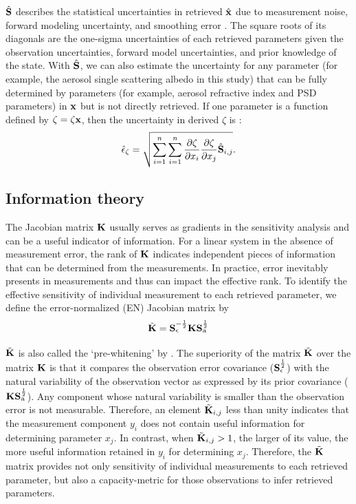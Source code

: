 $\hat{\mathbf{S}}$ describes the statistical uncertainties in retrieved
$\hat{\mathbf{x}}$ due to measurement noise, forward modeling uncertainty, 
and smoothing error \citep{Rodgers00}. The square roots of its 
diagonals are the one-sigma uncertainties of each retrieved parameters 
given the observation uncertainties, forward model uncertainties, 
and prior knowledge of the state. With $\hat{\mathbf{S}}$, we can also 
estimate the uncertainty for any parameter (for example, the aerosol single 
scattering albedo in this study) that can be fully
determined by parameters (for example, aerosol refractive index and PSD
parameters) in $\mathbf{x}$ but is not directly retrieved. If one
parameter is a function defined by $\zeta=\zeta{\mathbf{x}}$, then the 
uncertainty in derived $\zeta$ is \citep{Rodgers00}:
\begin{equation}
\hat{\epsilon}_\zeta =
\sqrt{\sum_{i=1}^n\sum_{i=1}^n
      \frac{\partial\zeta}{\partial{x_i}} 
      \frac{\partial\zeta}{\partial{x_j}}
      \hat{\mathbf{S}}_{i,j}
      }.\label{eq:zeta}
\end{equation}

\subsection{Information theory} \label{subsec:infotheory}

The Jacobian matrix $\mathbf{K}$ usually serves as gradients in the sensitivity
analysis and can be a useful indicator of information. For a linear
system in the absence of measurement error, the rank of $\mathbf{K}$ indicates
independent pieces of information that can be determined from the
measurements. In practice, error inevitably presents in measurements and
thus can impact the effective rank. To identify the effective
sensitivity of individual measurement to each retrieved parameter, we
define the error-normalized (EN) Jacobian matrix by
\begin{equation}
\tilde{\mathbf{K}} = \mathbf{S}_\epsilon^{-\frac{1}{2}}\mathbf{K}\mathbf{S}_\text{a}^{\frac{1}{2}}
\label{eq:enj}
\end{equation}

$\tilde{\mathbf{K}}$ is also called the ‘pre-whitening’ by \cite{Rodgers00}. 
The superiority of the matrix $\tilde{\mathbf{K}}$ over the matrix $\mathbf{K}$ is 
that it compares the observation error covariance
($\mathbf{S}_\epsilon^{\frac{1}{2}}$) with the natural variability of the
observation vector as expressed by its prior covariance
($\mathbf{K}\mathbf{S}_\text{a}^{\frac{1}{2}}$).
Any component whose natural variability is smaller than the observation
error is not measurable. Therefore, an element $\tilde{\mathbf{K}}_{i,j}$ less than
unity indicates that the measurement component $y_i$ does not contain useful
information for determining parameter $x_j$. In contrast, when
$\tilde{\mathbf{K}}_{i,j}>1$, the larger of its value, the more useful
information retained in $y_i$ for determining $x_j$. Therefore, the
$\tilde{\mathbf{K}}$ matrix provides not only sensitivity of individual 
measurements to each retrieved parameter, but also a capacity-metric 
for those observations to infer retrieved parameters. 

